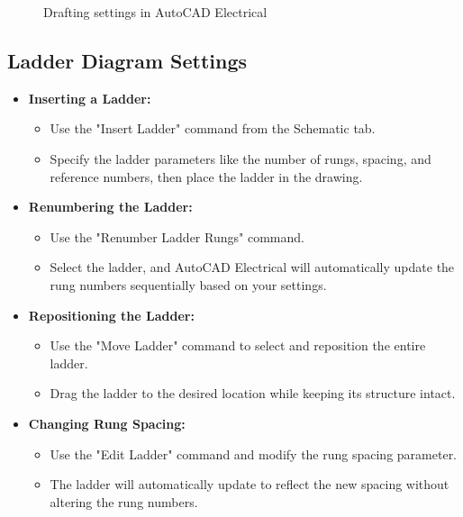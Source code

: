 \documentclass[12pt]{article}
\begin{document}
\begin{figure}[H]
\begin{minipage}{0.45\textwidth}
        \caption{Drafting settings in AutoCAD Electrical}
        \label{fig:draft_settings}
    \end{minipage}
\end{figure}

\subsection*{Ladder Diagram Settings}
\begin{itemize}
    \item \textbf{Inserting a Ladder:}
          \begin{itemize}
              \item Use the "Insert Ladder" command from the Schematic tab.
              \item Specify the ladder parameters like the number of rungs, spacing, and reference numbers, then place the ladder in the drawing.
          \end{itemize}
    \item \textbf{Renumbering the Ladder:}
          \begin{itemize}
              \item Use the "Renumber Ladder Rungs" command.
              \item Select the ladder, and AutoCAD Electrical will automatically update the rung numbers sequentially based on your settings.
          \end{itemize}
    \item \textbf{Repositioning the Ladder:}
          \begin{itemize}
              \item Use the "Move Ladder" command to select and reposition the entire ladder.
              \item Drag the ladder to the desired location while keeping its structure intact.
          \end{itemize}
    \item \textbf{Changing Rung Spacing:}
          \begin{itemize}
              \item Use the "Edit Ladder" command and modify the rung spacing parameter.
              \item The ladder will automatically update to reflect the new spacing without altering the rung numbers.
          \end{itemize}
\end{itemize}
\end{document}
